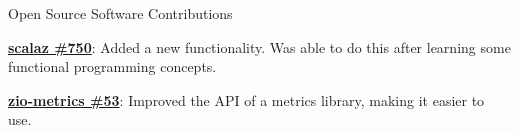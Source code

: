 \documentclass{resume} %
\begin{document}

\begin{rSection}{Open Source Software Contributions}
\begin{rList}
\item \textbf{\href{https://github.com/scalaz/scalaz/pull/750}{scalaz \#750}}: Added a new functionality. Was able to do this after learning some functional programming concepts.
\item \textbf{\href{https://github.com/zio/zio-metrics/pull/53}{zio-metrics \#53}}: Improved the API of a metrics library, making it easier to use.
\end{rList}
\end{rSection}





\end{document}
